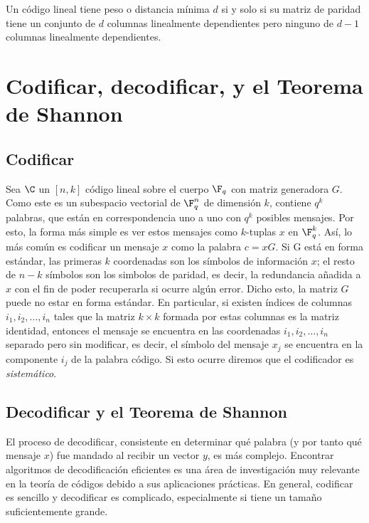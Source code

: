\begin{corollary}
\label{cor:distance_parity_matrix}
Un código lineal tiene peso o distancia mínima \(d\) si y solo si su matriz de paridad tiene un conjunto de \(d\) columnas linealmente dependientes pero ninguno de \(d-1\) columnas linealmente dependientes.
\end{corollary}

\section{Codificar, decodificar, y el Teorema de Shannon}

\subsection{Codificar}%
Sea \(\C\) un \([n,k]\) código lineal sobre el cuerpo \(\F_q\) con matriz generadora \(G\). Como este es un subespacio vectorial de \(\F_q^n\) de dimensión \(k\), contiene \(q^k\) palabras, que están en correspondencia uno a uno con \(q^k\) posibles mensajes. Por esto, la forma más simple es ver estos mensajes como \(k\)-tuplas \(x\) en \(\F_q^k\). Así, lo más común es codificar un mensaje \(x\) como la palabra \(c = xG\). Si G está en forma estándar, las primeras \(k\) coordenadas son los símbolos de información \(x\); el resto de \(n-k\) símbolos son los simbolos de paridad, es decir, la redundancia añadida a \(x\) con el fin de poder recuperarla si ocurre algún error. Dicho esto, la matriz \(G\) puede no estar en forma estándar. En particular, si existen índices de columnas \(i_1, i_2, \dots, i_n \) tales que la matriz \(k \times k\) formada por estas columnas es la matriz identidad, entonces el mensaje se encuentra en las coordenadas \(i_1, i_2, \dots, i_n \) separado pero sin modificar, es decir, el símbolo del mensaje \(x_j\) se encuentra en la componente \(i_j\) de la palabra código. Si esto ocurre diremos que el codificador es \textit{sistemático}.

\subsection{Decodificar y el Teorema de Shannon}%
\label{sub:decodificar_y_el_teorema_de_shannon}

El proceso de decodificar, consistente en determinar qué palabra (y por tanto qué mensaje \(x\)) fue mandado al recibir un vector \(y\), es más complejo. Encontrar algoritmos de decodificación eficientes es una área de investigación muy relevante en la teoría de códigos debido a sus aplicaciones prácticas. En general, codificar es sencillo y decodificar es complicado, especialmente si tiene un tamaño suficientemente grande.
